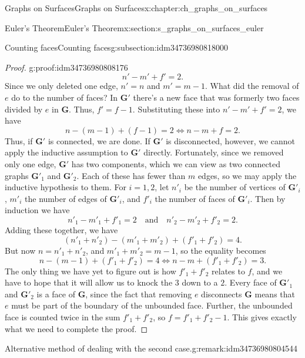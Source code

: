 \documentclass[oneside,10pt,]{book}
\numberwithin{equation}{section}
\newcommand{\bfG}{\mathbf{G}}
\begin{document}
\begin{chapterptx}{Graphs on Surfaces}{}{Graphs on Surfaces}{}{}{x:chapter:ch_graphs_on_surfaces}
\begin{sectionptx}{Euler's Theorem}{}{Euler's Theorem}{}{}{x:section:s_graphs_on_surfaces_euler}
\begin{subsectionptx}{Counting faces}{}{Counting faces}{}{}{g:subsection:idm34736980818000}
\begin{proof}{}{g:proof:idm34736980808176}
\begin{equation*}
n'-m'+f'=2.
\end{equation*}
Since we only deleted one edge, \(n'=n\) and \(m'=m-1\). What did the removal of \(e\) do to the number of faces? In \(\bfG'\) there's a new face that was formerly two faces divided by \(e\) in \(\bfG\). Thus, \(f'=f-1\). Substituting these into \(n'-m'+f'=2\), we have%
\begin{equation*}
n-(m-1)+(f-1)=2 \iff n-m+f=2.
\end{equation*}
Thus, if \(\bfG'\) is connected, we are done. If \(\bfG'\) is disconnected, however, we cannot apply the inductive assumption to \(\bfG'\) directly. Fortunately, since we removed only one edge, \(\bfG'\) has two components, which we can view as two connected graphs \(\bfG'_1\) and \(\bfG'_2\). Each of these has fewer than \(m\) edges, so we may apply the inductive hypothesis to them. For \(i=1,2\), let \(n'_i\) be the number of vertices of \(\bfG'_i\), \(m'_i\) the number of edges of \(\bfG'_i\), and \(f'_i\) the number of faces of \(\bfG'_i\). Then by induction we have%
\begin{equation*}
n'_1 - m'_1 + f'_1 = 2 \quad \text{and} \quad n'_2-m'_2+f'_2 =2.
\end{equation*}
Adding these together, we have%
\begin{equation*}
(n'_1 + n'_2) - (m'_1 + m'_2) + (f'_1 + f'_2) = 4.
\end{equation*}
But now \(n=n'_1 + n'_2\), and \(m'_1 + m'_2 = m-1\), so the equality becomes%
\begin{equation*}
n - (m-1) + (f'_1+f'_2) = 4 \iff n-m + (f'_1 + f'_2) = 3.
\end{equation*}
The only thing we have yet to figure out is how \(f'_1+f'_2\) relates to \(f\), and we have to hope that it will allow us to knock the \(3\) down to a \(2\). Every face of \(\bfG'_1\) and \(\bfG'_2\) is a face of \(\bfG\), since the fact that removing \(e\) disconnects \(\bfG\) means that \(e\) must be part of the boundary of the unbounded face. Further, the unbounded face is counted twice in the sum \(f'_1 + f'_2\), so \(f=f'_1 + f'_2 -1\). This gives exactly what we need to complete the proof.%
\end{proof}
\begin{remark}{Alternative method of dealing with the second case.}{g:remark:idm34736980804544}%

\end{remark}
\end{subsectionptx}
\end{sectionptx}
\end{chapterptx}
\end{document}
